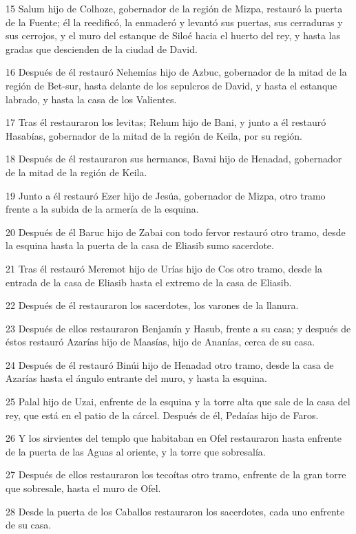 \par 15 Salum hijo de Colhoze, gobernador de la región de Mizpa, restauró la puerta de la Fuente; él la reedificó, la enmaderó y levantó sus puertas, sus cerraduras y sus cerrojos, y el muro del estanque de Siloé hacia el huerto del rey, y hasta las gradas que descienden de la ciudad de David.
\par 16 Después de él restauró Nehemías hijo de Azbuc, gobernador de la mitad de la región de Bet-sur, hasta delante de los sepulcros de David, y hasta el estanque labrado, y hasta la casa de los Valientes.
\par 17 Tras él restauraron los levitas; Rehum hijo de Bani, y junto a él restauró Hasabías, gobernador de la mitad de la región de Keila, por su región.
\par 18 Después de él restauraron sus hermanos, Bavai hijo de Henadad, gobernador de la mitad de la región de Keila.
\par 19 Junto a él restauró Ezer hijo de Jesúa, gobernador de Mizpa, otro tramo frente a la subida de la armería de la esquina.
\par 20 Después de él Baruc hijo de Zabai con todo fervor restauró otro tramo, desde la esquina hasta la puerta de la casa de Eliasib sumo sacerdote.
\par 21 Tras él restauró Meremot hijo de Urías hijo de Cos otro tramo, desde la entrada de la casa de Eliasib hasta el extremo de la casa de Eliasib.
\par 22 Después de él restauraron los sacerdotes, los varones de la llanura.
\par 23 Después de ellos restauraron Benjamín y Hasub, frente a su casa; y después de éstos restauró Azarías hijo de Maasías, hijo de Ananías, cerca de su casa.
\par 24 Después de él restauró Binúi hijo de Henadad otro tramo, desde la casa de Azarías hasta el ángulo entrante del muro, y hasta la esquina.
\par 25 Palal hijo de Uzai, enfrente de la esquina y la torre alta que sale de la casa del rey, que está en el patio de la cárcel. Después de él, Pedaías hijo de Faros.
\par 26 Y los sirvientes del templo que habitaban en Ofel restauraron hasta enfrente de la puerta de las Aguas al oriente, y la torre que sobresalía.
\par 27 Después de ellos restauraron los tecoítas otro tramo, enfrente de la gran torre que sobresale, hasta el muro de Ofel.
\par 28 Desde la puerta de los Caballos restauraron los sacerdotes, cada uno enfrente de su casa.
